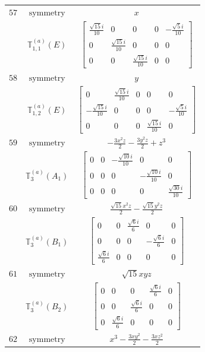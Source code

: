 \documentclass[fleqn,8pt,landscape]{jsarticle}
\begin{document}
\begin{longtable}{ccc}
$ 57 $ & $ \text{symmetry} $ & $ x $ \\
$  $ & $ \mathbb{T}_{1,1}^{(a)}(E) $ & $ \begin{bmatrix} \frac{\sqrt{15} i}{10} & 0 & 0 & 0 & - \frac{\sqrt{5} i}{10} \\ 0 & \frac{\sqrt{15} i}{10} & 0 & 0 & 0 \\ 0 & 0 & \frac{\sqrt{15} i}{10} & 0 & 0 \end{bmatrix} $ \\ \hline
$ 58 $ & $ \text{symmetry} $ & $ y $ \\
$  $ & $ \mathbb{T}_{1,2}^{(a)}(E) $ & $ \begin{bmatrix} 0 & \frac{\sqrt{15} i}{10} & 0 & 0 & 0 \\ - \frac{\sqrt{15} i}{10} & 0 & 0 & 0 & - \frac{\sqrt{5} i}{10} \\ 0 & 0 & 0 & \frac{\sqrt{15} i}{10} & 0 \end{bmatrix} $ \\ \hline
$ 59 $ & $ \text{symmetry} $ & $ - \frac{3 x^{2} z}{2} - \frac{3 y^{2} z}{2} + z^{3} $ \\
$  $ & $ \mathbb{T}_{3}^{(a)}(A_{1}) $ & $ \begin{bmatrix} 0 & 0 & - \frac{\sqrt{10} i}{10} & 0 & 0 \\ 0 & 0 & 0 & - \frac{\sqrt{10} i}{10} & 0 \\ 0 & 0 & 0 & 0 & \frac{\sqrt{30} i}{10} \end{bmatrix} $ \\ \hline
$ 60 $ & $ \text{symmetry} $ & $ \frac{\sqrt{15} x^{2} z}{2} - \frac{\sqrt{15} y^{2} z}{2} $ \\
$  $ & $ \mathbb{T}_{3}^{(a)}(B_{1}) $ & $ \begin{bmatrix} 0 & 0 & \frac{\sqrt{6} i}{6} & 0 & 0 \\ 0 & 0 & 0 & - \frac{\sqrt{6} i}{6} & 0 \\ \frac{\sqrt{6} i}{6} & 0 & 0 & 0 & 0 \end{bmatrix} $ \\ \hline
$ 61 $ & $ \text{symmetry} $ & $ \sqrt{15} x y z $ \\
$  $ & $ \mathbb{T}_{3}^{(a)}(B_{2}) $ & $ \begin{bmatrix} 0 & 0 & 0 & \frac{\sqrt{6} i}{6} & 0 \\ 0 & 0 & \frac{\sqrt{6} i}{6} & 0 & 0 \\ 0 & \frac{\sqrt{6} i}{6} & 0 & 0 & 0 \end{bmatrix} $ \\ \hline
$ 62 $ & $ \text{symmetry} $ & $ x^{3} - \frac{3 x y^{2}}{2} - \frac{3 x z^{2}}{2} $ \\

\end{longtable}
\end{document}
